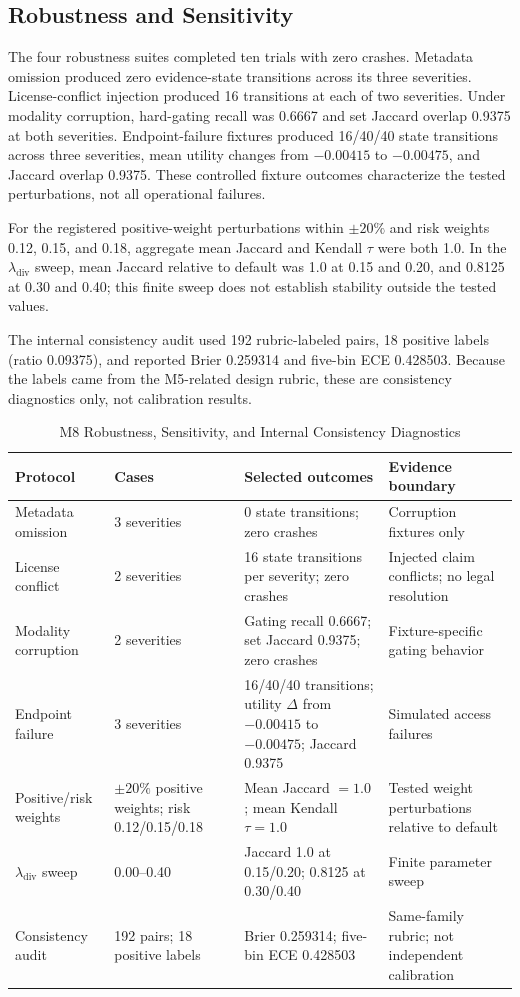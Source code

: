 \documentclass[conference]{IEEEtran}
\begin{document}
\subsection{Robustness and Sensitivity}
The four robustness suites completed ten trials with zero crashes. Metadata omission produced zero evidence-state transitions across its three severities. License-conflict injection produced 16 transitions at each of two severities. Under modality corruption, hard-gating recall was 0.6667 and set Jaccard overlap 0.9375 at both severities. Endpoint-failure fixtures produced 16/40/40 state transitions across three severities, mean utility changes from $-0.00415$ to $-0.00475$, and Jaccard overlap 0.9375. These controlled fixture outcomes characterize the tested perturbations, not all operational failures.

For the registered positive-weight perturbations within $\pm20\%$ and risk weights 0.12, 0.15, and 0.18, aggregate mean Jaccard and Kendall $\tau$ were both 1.0. In the $\lambda_{\mathrm{div}}$ sweep, mean Jaccard relative to default was 1.0 at 0.15 and 0.20, and 0.8125 at 0.30 and 0.40; this finite sweep does not establish stability outside the tested values.

The internal consistency audit used 192 rubric-labeled pairs, 18 positive labels (ratio 0.09375), and reported Brier 0.259314 and five-bin ECE 0.428503. Because the labels came from the M5-related design rubric, these are consistency diagnostics only, not calibration results.

\begin{table}[t]
\caption{M8 Robustness, Sensitivity, and Internal Consistency Diagnostics}
\label{tab:m8-stability}
\centering
\footnotesize
\begin{tabularx}{\textwidth}{@{}p{1.10in}p{0.90in}X p{1.85in}@{}}
\toprule
Protocol & Cases & Selected outcomes & Evidence boundary \\
\midrule
Metadata omission & 3 severities & 0 state transitions; zero crashes & Corruption fixtures only \\
License conflict & 2 severities & 16 state transitions per severity; zero crashes & Injected claim conflicts; no legal resolution \\
Modality corruption & 2 severities & Gating recall 0.6667; set Jaccard 0.9375; zero crashes & Fixture-specific gating behavior \\
Endpoint failure & 3 severities & 16/40/40 transitions; utility $\Delta$ from $-0.00415$ to $-0.00475$; Jaccard 0.9375 & Simulated access failures \\
Positive/risk weights & $\pm20\%$ positive weights; risk 0.12/0.15/0.18 & Mean Jaccard $=1.0$; mean Kendall $\tau=1.0$ & Tested weight perturbations relative to default \\
$\lambda_{\mathrm{div}}$ sweep & 0.00--0.40 & Jaccard 1.0 at 0.15/0.20; 0.8125 at 0.30/0.40 & Finite parameter sweep \\
Consistency audit & 192 pairs; 18 positive labels & Brier 0.259314; five-bin ECE 0.428503 & Same-family rubric; not independent calibration \\
\bottomrule
\end{tabularx}
\end{table}
\end{document}
